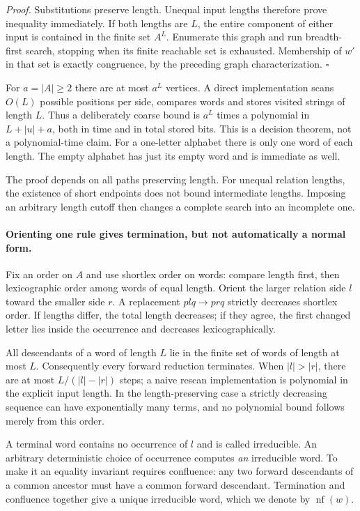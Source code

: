 \documentclass[11pt]{article}
\begin{document}
\emph{Proof.} Substitutions preserve length. Unequal input lengths
therefore prove inequality immediately. If both lengths are $L$, the
entire component of either input is contained in the finite set $A^L$.
Enumerate this graph and run breadth-first search, stopping when its
finite reachable set is exhausted. Membership of $w'$ in that set is
exactly congruence, by the preceding graph characterization.
\hfill$\square$

For $a=|A|\ge2$ there are at most $a^L$ vertices. A direct implementation
scans $O(L)$ possible positions per side, compares words and stores
visited strings of length $L$. Thus a deliberately coarse bound is
$a^L$ times a polynomial in $L+|u|+a$, both in time and in total stored
bits. This is a decision theorem, not a polynomial-time claim. For a
one-letter alphabet there is only one word of each length. The empty
alphabet has just its empty word and is immediate as well.

The proof depends on all paths preserving length. For unequal relation
lengths, the existence of short endpoints does not bound intermediate
lengths. Imposing an arbitrary length cutoff then changes a complete
search into an incomplete one.

\paragraph{Orienting one rule gives termination, but not automatically a normal form.}
Fix an order on $A$ and use shortlex order on words: compare length
first, then lexicographic order among words of equal length. Orient the
larger relation side $l$ toward the smaller side $r$. A replacement
$p l q\to p r q$ strictly decreases shortlex order. If lengths differ,
the total length decreases; if they agree, the first changed letter
lies inside the occurrence and decreases lexicographically.

All descendants of a word of length $L$ lie in the finite set of words
of length at most $L$. Consequently every forward reduction terminates.
When $|l|>|r|$, there are at most $L/(|l|-|r|)$ steps; a naive rescan
implementation is polynomial in the explicit input length. In the
length-preserving case a strictly decreasing sequence can have
exponentially many terms, and no polynomial bound follows merely
from this order.

A terminal word contains no occurrence of $l$ and is called irreducible.
An arbitrary deterministic choice of occurrence computes \emph{an}
irreducible word. To make it an equality invariant requires confluence:
any two forward descendants of a common ancestor must have a common
forward descendant. Termination and confluence together give a unique
irreducible word, which we denote by $\operatorname{nf}(w)$.
\end{document}
